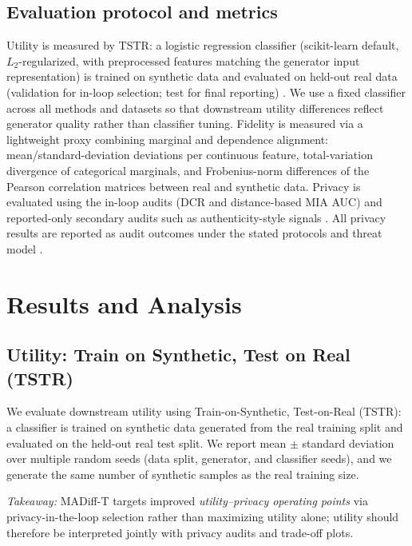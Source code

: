 \documentclass[preprint,12pt]{elsarticle}
\begin{document}
\subsection{Evaluation protocol and metrics}
Utility is measured by TSTR: a logistic regression classifier (scikit-learn default, $L_2$-regularized, with preprocessed features matching the generator input representation) is trained on synthetic data and evaluated on held-out real data (validation for in-loop selection; test for final reporting) \cite{Jia2024}. We use a fixed classifier across all methods and datasets so that downstream utility differences reflect generator quality rather than classifier tuning. Fidelity is measured via a lightweight proxy combining marginal and dependence alignment: mean/standard-deviation deviations per continuous feature, total-variation divergence of categorical marginals, and Frobenius-norm differences of the Pearson correlation matrices between real and synthetic data. Privacy is evaluated using the in-loop audits (DCR and distance-based MIA AUC) and reported-only secondary audits such as authenticity-style signals \cite{Alaa2022,lautrup2025syntheval}. All privacy results are reported as audit outcomes under the stated protocols and threat model \cite{Hernandez2025,Hyrup2025}.

\section{Results and Analysis}\label{sec:results}

\subsection{Utility: Train on Synthetic, Test on Real (TSTR)}\label{sec:results_utility}
We evaluate downstream utility using Train-on-Synthetic, Test-on-Real (TSTR): a classifier is trained on synthetic data generated from the real training split and evaluated on the held-out real test split. We report mean $\pm$ standard deviation over multiple random seeds (data split, generator, and classifier seeds), and we generate the same number of synthetic samples as the real training size.

\noindent\textit{Takeaway:} MADiff-T targets improved \emph{utility--privacy operating points} via privacy-in-the-loop selection rather than maximizing utility alone; utility should therefore be interpreted jointly with privacy audits and trade-off plots.
\end{document}
